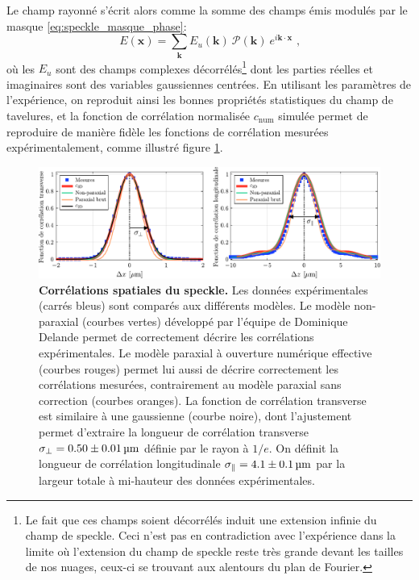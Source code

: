 Le champ rayonné s'écrit alors comme la somme des champs émis modulés par le masque \ref{eq:speckle_masque_phase}:
\begin{equation}
E(\mathbf{x})=\sum_{\mathbf{k}} E_u(\mathbf{k}) \: \mathcal{P}(\mathbf{k}) \: e^{i \mathbf{k} \cdot \mathbf{x}} \text{ ,}
\label{eq:huygens_fresnel_num}
\end{equation}
où les $E_u$ sont des champs complexes décorrélés\footnote{Le fait que ces champs soient décorrélés induit une extension infinie du champ de speckle. Ceci n'est pas en contradiction avec l'expérience dans la limite où l'extension du champ de speckle reste très grande devant les tailles de nos nuages, ceux-ci se trouvant aux alentours du plan de Fourier.} dont les parties réelles et imaginaires sont des variables gaussiennes centrées. En utilisant les paramètres de l'expérience, on reproduit ainsi les bonnes propriétés statistiques du champ de tavelures, et la fonction de corrélation normalisée $c_{\mathrm{num}}$ simulée
permet de reproduire de manière fidèle les fonctions de corrélation mesurées expérimentalement, comme illustré figure \ref{fig:speckle_correlations_exp}.





\begin{figure}
\centering
\includegraphics[width=\textwidth]{Fig/Speckle/speckle_correlations_exp.pdf}
\caption{\textbf{Corrélations spatiales du speckle.} Les données expérimentales (carrés bleus) sont comparés aux différents modèles. Le modèle non-paraxial (courbes vertes) développé par l'équipe de Dominique Delande permet de correctement décrire les corrélations expérimentales. Le modèle paraxial à ouverture numérique effective (courbes rouges) permet lui aussi de décrire correctement les corrélations mesurées, contrairement au modèle paraxial sans correction (courbes oranges). La fonction de corrélation transverse est similaire à une gaussienne (courbe noire), dont l'ajustement permet d'extraire la longueur de corrélation transverse $\sigma_{\perp}=0.50\pm\SI{0.01}{\micro\metre}$ définie par le rayon à $1/e$. On définit la longueur de corrélation longitudinale $\sigma_{\parallel}=4.1\pm\SI{0.1}{\micro\metre}$ par la largeur totale à mi-hauteur des données expérimentales.}
\label{fig:speckle_correlations_exp}
\end{figure}





